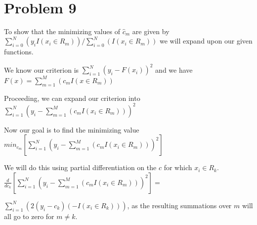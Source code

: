\documentclass[11pt]{article}
\begin{document}
\begin{center}

\ \\
\end{center}


\section*{Problem 9}

\vspace{5 mm}
\noindent
To show that the minimizing values of $\hat{c}_{m}$ are given by $\sum\limits_{i=0}^N (y_{i} I(x_{i} \in R_{m})) / \sum\limits_{i=0}^N (I(x_{i} \in R_{m}))$ we will expand upon our given functions.

\vspace{3 mm}
\noindent
We know our criterion is $\sum\limits_{i=1}^N (y_{i} - F(x_{i}))^2$ and we have $F(x) = \sum\limits_{m=1}^M (c_{m}I(x \in R_{m}))$

\vspace{3 mm}
\noindent
Proceeding, we can expand our criterion into $\sum\limits_{i=1}^N (y_{i} - \sum\limits_{m=1}^M (c_{m}I(x_{i} \in R_{m})))^2$

\vspace{3 mm}
\noindent
Now our goal is to find the minimizing value $min_{c_{m}}[\sum\limits_{i=1}^N (y_{i} - \sum\limits_{m=1}^M (c_{m}I(x_{i} \in R_{m})))^2]$ 

\vspace{3 mm}
\noindent
We will do this using partial differentiation on the $c$ for which $x_{i} \in R_{k}$.  $\frac{d}{dc_{k}}[\sum\limits_{i=1}^N (y_{i} - \sum\limits_{m=1}^M (c_{m}I(x_{i} \in R_{m})))^2] = $

\vspace{3 mm}
\noindent
$\sum\limits_{i=1}^N (2(y_{i} - c_{k})(-I(x_{i} \in R_{k})))$, as the resulting summations over $m$ will all go to zero for $m \neq k$.
\end{document}
